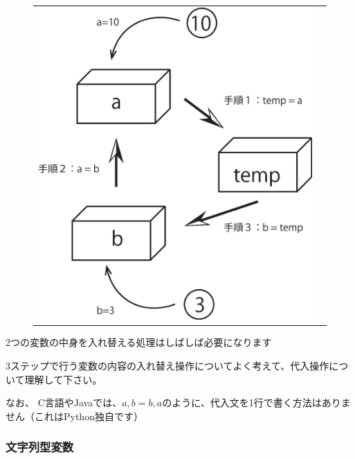\documentclass[uplatex,a4paper,11pt,oneside,openany]{jsbook}
\begin{document}
\begin{figure}[H]
  \centering
  \begin{tabular}{lr}
      \begin{minipage}{0.45\hsize}
      \centering

      \end{minipage}
      \begin{minipage}{0.45\hsize}
      \flushright
\includegraphics[scale=0.35]{figures/eps/fig1.eps}
      \end{minipage}
    \end{tabular}
\end{figure}%

2つの変数の中身を入れ替える処理はしばしば必要になります

3ステップで行う変数の内容の入れ替え操作についてよく考えて、代入操作について理解して下さい。

なお、
C言語やJavaでは、$a, b = b, a$のように、代入文を1行で書く方法はありません（これはPython独自です）

\subsubsection{文字列型変数}
\end{document}

